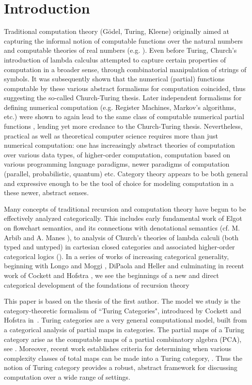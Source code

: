 \documentclass{entcs} \usepackage{entcsmacro}
\begin{document}
\section{Introduction}\label{intro}

Traditional computation theory (G\"odel, Turing, Kleene) originally aimed at capturing the 
informal notion of computable functions over the natural numbers and computable theories of real numbers
(e.g. \cite{Turing-Paper,IMM}).  Even before Turing, Church's introduction of lambda calculus \cite{Church}  attempted to capture certain properties of computation in a broader sense,
through combinatorial manipulation of strings of symbols. It was subsequently shown that the
numerical (partial) functions computable by these various abstract formalisms for computation coincided, thus suggesting the so-called Church-Turing thesis.  Later independent formalisms
for defining numerical computation (e.g. Register Machines, Markov's algorithms, etc.) were shown to again lead to the same class of computable numerical partial functions , lending yet more credance to the Church-Turing thesis.  Nevertheless, practical as well as theoretical computer science requires more than just numerical computation:  one has increasingly abstract theories of computation over various data types, of higher-order computation, computation based on various programming language paradigms, newer paradigms of computation (parallel, probabilistic, quantum) etc.  Category theory appears to be both general and expressive enough to be 
the tool of choice for modeling computation in a these newer, abstract senses. 

Many concepts of traditional recursion and computation theory have begun to be effectively analyzed categorically.  This includes early fundamental work of Elgot on flowchart semantics,
and its connections with denotational semantics  (cf.  M. Arbib and A. Manes \cite{MA}), to 
analysis of Church's theories of lambda calculi (both typed and untyped) in cartesian closed categories and associated higher-order categorical logics (\cite{HOCL}).  In a series of works
of increasing categorical generality, beginning with Longo and Moggi \cite{LMog}, DiPaola and Heller \cite{DiPao} and culminating in recent work of Cockett and Hofstra \cite{Turing}, we see the beginnings of a new and direct categorical development of the foundations of recursion theory 


This paper is based on the thesis of the first author. The model we study is the category-theoretic formalism of ``Turing Categories", introduced by Cockett and Hofstra in~\cite{Turing}. Turing categories are a very general computational model, built from a categorical analysis of 
partial maps in categories. The partial maps of a Turing category arise as the computable maps of a partial combinatory algebra (PCA), see \cite{Turing}.  Moreover,  recent work establishes criteria for 
determining when various complexity classes of total maps  can be made into a Turing category, 
\cite{Total}.  Thus the notion of Turing category provides a robust, abstract framework for discussing computation over a wide range of settings. 
\end{document}
